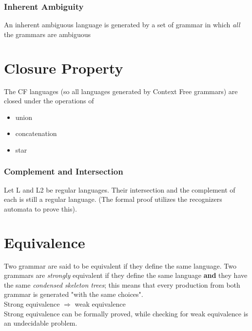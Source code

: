 			\subsubsection{Inherent Ambiguity}
				An inherent ambiguous language is generated by a set of grammar in which \emph{all} the grammars are ambiguous\\					
	
	\section{Closure Property}
		The CF languages (so all languages generated by Context Free grammars) are closed under the operations of
		\begin{itemize}
			\item union
			\item concatenation
			\item star
		\end{itemize}
		
		\subsubsection{Complement and Intersection}
			Let L and L2 be regular languages. Their intersection and the complement of each is still a regular language. (The formal proof utilizes the recognizers automata to prove this).
	
	\section{Equivalence}
		Two grammar are said to be equivalent if they define the same language. Two grammars are \emph{strongly} equivalent if they define the same language \textbf{and} they have the same \emph{condensed skeleton trees}; this means that every production from both grammar is generated "with the same choices".\\
		Strong equivalence $\Rightarrow$ weak equivalence\\
		Strong equivalence can be formally proved, while checking for weak equivalence is an undecidable problem.\\
